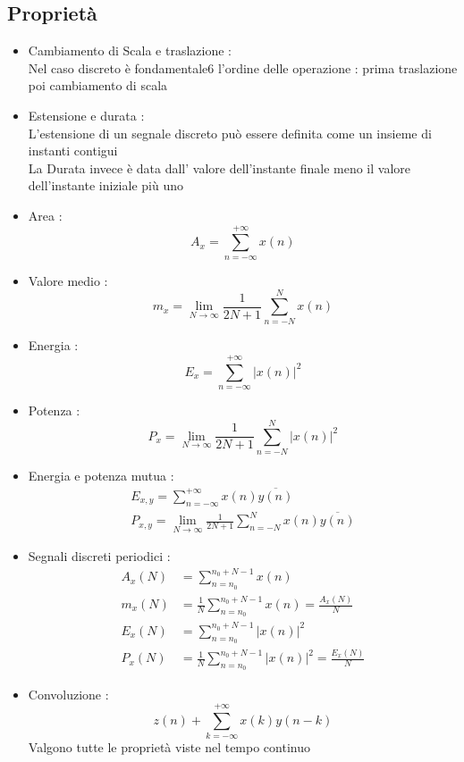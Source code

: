 \documentclass{article}
\theoremstyle{definition}
\begin{document}
\subsection{Proprietà}
\begin{itemize}
	\item Cambiamento di Scala e traslazione : \\ 
	Nel caso discreto è fondamentale6 l'ordine delle operazione : prima traslazione poi cambiamento di scala 
	\item Estensione e durata : \\
	L'estensione di un segnale discreto può essere definita come un insieme di instanti contigui \\ 
	La Durata invece è data dall' valore dell'instante finale meno il valore dell'instante iniziale più uno 
	\item Area : 
	$$A_x=\sum_{n=-\infty}^{+\infty}x(n)$$
	\item Valore medio : 
	$$m_x=\lim_{N\rightarrow \infty }\frac{1}{2N+1}\sum_{n=-N}^{N}x(n)$$
	\item Energia :
	$$E_x=\sum_{n=-\infty}^{+\infty}|x(n)|^2$$
	\item Potenza : 
	$$P_x=\lim_{N\rightarrow \infty }\frac{1}{2N+1}\sum_{n=-N}^{N}|x(n)|^2$$
	\item Energia e potenza mutua : 
	\begin{align*}
		E_{x,y}=\sum_{n=-\infty}^{+\infty} x(n)\overline{y(n)} \\
		P_{x,y}=\lim_{N\rightarrow \infty }\frac{1}{2N+1}\sum_{n=-N}^{N}x(n)\overline{y(n)}
	\end{align*}
	\item Segnali discreti periodici :
	\begin{align*}
		A_x(N) &= \sum_{n=n_0}^{n_0+N-1} x(n) \\
		m_x(N) &= \frac{1}{N} \sum_{n=n_0}^{n_0+N-1} x(n) = \frac{A_x(N)}{N} \\
		E_x(N) &= \sum_{n=n_0}^{n_0+N-1} |x(n)|^2 \\
		P_x(N) &= \frac{1}{N} \sum_{n=n_0}^{n_0+N-1} |x(n)|^2 = \frac{E_x(N)}{N}
	\end{align*}
	\item Convoluzione : 
	$$z(n)+\sum_{k=-\infty}^{+\infty}x(k)y(n-k)$$
	Valgono tutte le proprietà viste nel tempo continuo
	\end{itemize}
\end{document}
